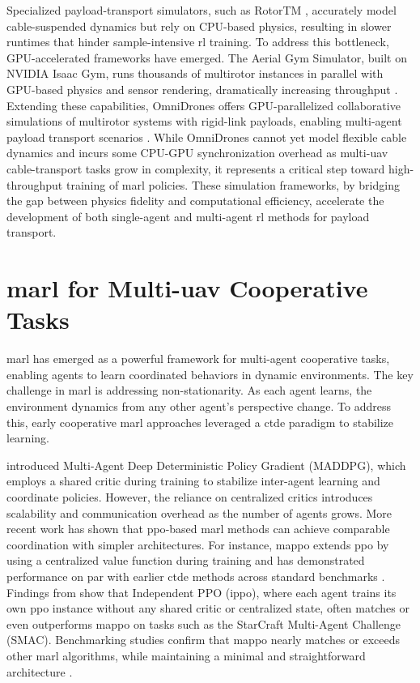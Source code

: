 Specialized payload-transport simulators, such as RotorTM \cite{Li2022RotorTMAF}, accurately model cable-suspended dynamics but rely on CPU-based physics, resulting in slower runtimes that hinder sample-intensive \gls{rl} training. To address this bottleneck, GPU-accelerated frameworks have emerged. The Aerial Gym Simulator, built on NVIDIA Isaac Gym, runs thousands of multirotor instances in parallel with GPU-based physics and sensor rendering, dramatically increasing throughput \cite{aerial_gym_simulator}. Extending these capabilities, OmniDrones offers GPU-parallelized collaborative simulations of multirotor systems with rigid-link payloads, enabling multi-agent payload transport scenarios \cite{xu_omnidrones_2024}. While OmniDrones cannot yet model flexible cable dynamics and incurs some CPU-GPU synchronization overhead as multi-\gls{uav} cable-transport tasks grow in complexity, it represents a critical step toward high-throughput training of \gls{marl} policies. These simulation frameworks, by bridging the gap between physics fidelity and computational efficiency, accelerate the development of both single-agent and multi-agent \gls{rl} methods for payload transport.


\section{\gls{marl} for Multi-\gls{uav} Cooperative Tasks}

\gls{marl} has emerged as a powerful framework for multi-agent cooperative tasks, enabling agents to learn coordinated behaviors in dynamic environments. The key challenge in \gls{marl} is addressing non-stationarity. As each agent learns, the environment dynamics from any other agent's perspective change. To address this, early cooperative \gls{marl} approaches leveraged a \gls{ctde}  paradigm to stabilize learning.

\cite{Lowe2017MultiAgentAF} introduced Multi-Agent Deep Deterministic Policy Gradient (MADDPG), which employs a shared critic during training to stabilize inter-agent learning and coordinate policies. However, the reliance on centralized critics introduces scalability and communication overhead as the number of agents grows. More recent work has shown that \gls{ppo}-based \gls{marl} methods can achieve comparable coordination with simpler architectures. For instance, \gls{mappo} extends \gls{ppo} by using a centralized value function during training and has demonstrated performance on par with earlier \gls{ctde} methods across standard benchmarks \cite{yu_surprising_2022}. Findings from \cite{witt_is_2020} show that Independent PPO (\gls{ippo}), where each agent trains its own \gls{ppo} instance without any shared critic or centralized state, often matches or even outperforms \gls{mappo} on tasks such as the StarCraft Multi-Agent Challenge (SMAC). Benchmarking studies confirm that \gls{mappo} nearly matches or exceeds other \gls{marl} algorithms, while maintaining a minimal and straightforward architecture \cite{Papoudakis2020BenchmarkingMD}.

